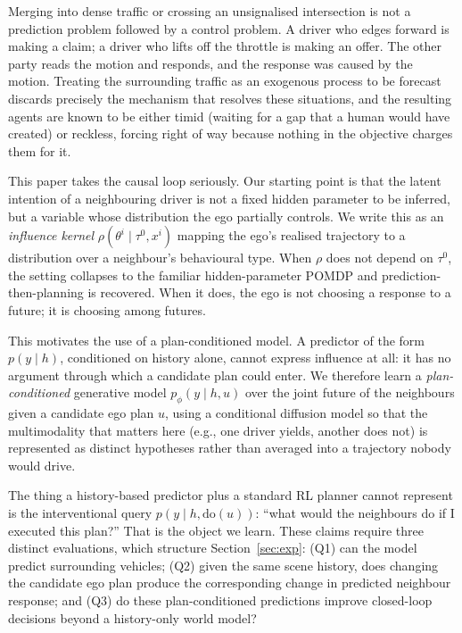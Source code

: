 \documentclass[conference]{IEEEtran}
\begin{document}
Merging into dense traffic or crossing an unsignalised intersection is not a
prediction problem followed by a control problem. A driver who edges forward is
making a claim; a driver who lifts off the throttle is making an offer. The
other party reads the motion and responds, and the response was caused by the
motion. Treating the surrounding traffic as an exogenous process to be forecast
discards precisely the mechanism that resolves these situations, and the
resulting agents are known to be either timid (waiting for a gap that a human
would have created) or reckless, forcing right of way because nothing in the
objective charges them for it.

This paper takes the causal loop seriously. Our starting point is that the
latent intention of a neighbouring driver is not a fixed hidden parameter to be
inferred, but a variable whose distribution the ego partially controls. We write
this as an \emph{influence kernel} $\rho(\theta^i \mid \tau^0, x^i)$ mapping the
ego's realised trajectory to a distribution over a neighbour's behavioural type.
When $\rho$ does not depend on $\tau^0$, the setting collapses to the familiar
hidden-parameter POMDP and prediction-then-planning is recovered. When it does,
the ego is not choosing a response to a future; it is choosing among futures.

This motivates the use of a plan-conditioned model. A predictor of the form $p(y \mid h)$, conditioned on history alone, cannot express
influence at all: it has no argument through which a candidate plan could enter.
We therefore learn a \emph{plan-conditioned} generative model $p_\phi(y \mid h,u)$ over the joint future of the neighbours given a candidate ego plan $u$, using
a conditional diffusion model so that the multimodality that matters here (e.g.,
one driver yields, another does not) is represented as distinct hypotheses
rather than averaged into a trajectory nobody would drive.

The thing a history-based predictor plus a standard RL planner cannot represent
is the interventional query $p(y \mid h, \mathrm{do}(u))$: ``what would the
neighbours do if I executed this plan?'' That is the object we learn. These claims require three distinct evaluations, which structure Section~\ref{sec:exp}: 
(Q1) can the model predict surrounding vehicles; 
(Q2) given the same scene history, does changing the candidate ego plan produce the corresponding change in predicted neighbour response; and 
(Q3) do these plan-conditioned predictions improve closed-loop decisions beyond a history-only world model?
\end{document}
